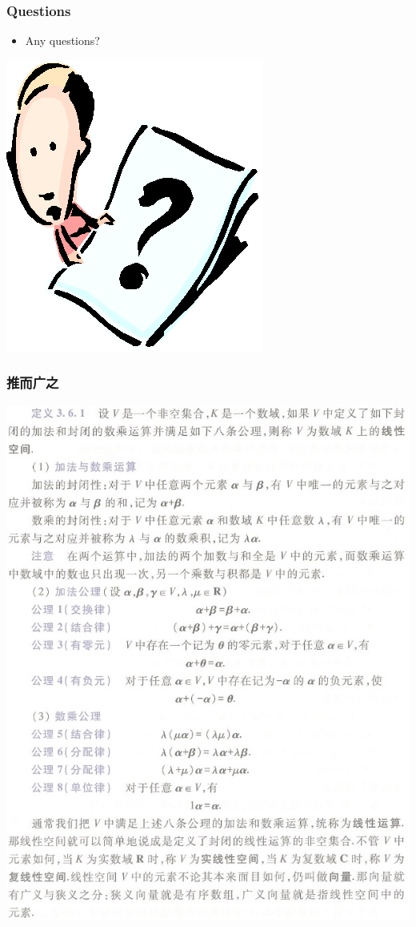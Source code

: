 \documentclass[CJKutf8,xcolor=pdftex,dvipsnames,table]{beamer}
\begin{document}
\begin{CJK*}{UTF8}{song}
  \begin{frame}
    \frametitle{Questions}
    \begin{itemize}
    \item Any questions?
    \end{itemize}
    \begin{center}
      \includegraphics[scale=.5]{question}
    \end{center}
  \end{frame} 
  
  \begin{frame}
    \frametitle{推而广之}
    \begin{center}
      \includegraphics[scale=.3]{cqu-la-def-3-6-1}
    \end{center}
  \end{frame}   


\end{CJK*}
\end{document}
